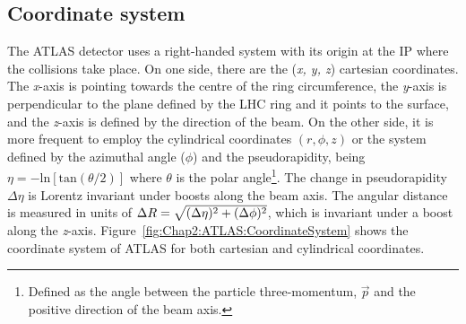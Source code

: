  


\subsection{Coordinate system}
\label{sec:Chap2:ATLAS:CoordinateSystem}
The ATLAS detector uses a right-handed system with its origin at the IP where the collisions take place. 
On one side, there are the (\textit{x, y, z}) cartesian coordinates. The \textit{x}-axis is pointing towards the centre of the ring 
circumference, the \textit{y}-axis is perpendicular to the plane defined by the LHC ring and it points to the surface, and the \textit{z}-axis
is defined by the direction of the beam. 
On the other side, it is more frequent to employ the cylindrical coordinates $(r, \phi, z)$ or the system defined by the azimuthal angle ($\phi$)
and the pseudorapidity, being $\eta = -\textrm{ln}\left[ \textrm{tan}(\theta/2)\right]$
%
%
where $\theta$ is the polar angle\footnote{Defined as the angle between the particle three-momentum, $\overrightarrow{p}$ and the positive direction of the beam axis.}.  
The change in pseudorapidity $\Delta \eta$ is Lorentz invariant under boosts along the beam axis.
The angular distance is measured in units of $\Delta R = \sqrt{(\Delta \eta)^{2}+(\Delta \phi)^{2}}$, which is invariant under a boost along the 
\textit{z}-axis.  %
 Figure~\ref{fig:Chap2:ATLAS:CoordinateSystem} shows the coordinate system of ATLAS for both cartesian and cylindrical coordinates. 

